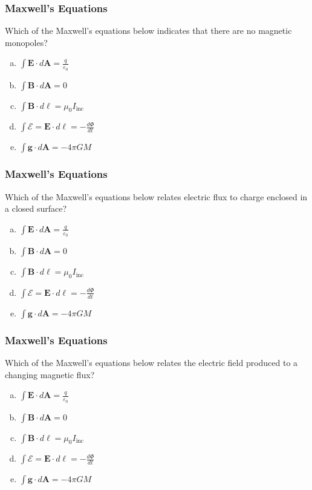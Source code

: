 \documentclass[12pt,aspectratio=169]{beamer}
\newcommand{\mb}[1]{\mathbf{#1}}
\begin{document}
\begin{frame}
  \frametitle{Maxwell's Equations}
  Which of the Maxwell's equations below indicates that there are no
  magnetic monopoles?
  \begin{enumerate}[(a)]
  \item $\displaystyle\int\mb{E}\cdot d\mb{A}=\frac{q}{\varepsilon_0}$
  \item $\displaystyle\int\mb{B}\cdot d\mb{A}=0$
  \item $\displaystyle\int\mb{B}\cdot d\mb{\ell}=\mu_0 I_{\textrm{inc}}$
  \item $\displaystyle\int\mathcal{E}=\mb{E}\cdot d\mb{\ell}=-\frac{d\Phi}{dt}$
  \item $\displaystyle\int\mb{g}\cdot d\mb{A}=-4\pi GM$
  \end{enumerate}
\end{frame}


\begin{frame}
  \frametitle{Maxwell's Equations}
  Which of the Maxwell's equations below relates electric flux to charge
  enclosed in a closed surface?
  \begin{enumerate}[(a)]
  \item $\displaystyle\int\mb{E}\cdot d\mb{A}=\frac{q}{\varepsilon_0}$
  \item $\displaystyle\int\mb{B}\cdot d\mb{A}=0$
  \item $\displaystyle\int\mb{B}\cdot d\mb{\ell}=\mu_0 I_{\textrm{inc}}$
  \item $\displaystyle\int\mathcal{E}=\mb{E}\cdot d\mb{\ell}=-\frac{d\Phi}{dt}$
  \item $\displaystyle\int\mb{g}\cdot d\mb{A}=-4\pi GM$
  \end{enumerate}
\end{frame}

\begin{frame}
  \frametitle{Maxwell's Equations}
  Which of the Maxwell's equations below relates the electric field
  produced to a changing magnetic flux?
  \begin{enumerate}[(a)]
  \item $\displaystyle\int\mb{E}\cdot d\mb{A}=\frac{q}{\varepsilon_0}$
  \item $\displaystyle\int\mb{B}\cdot d\mb{A}=0$
  \item $\displaystyle\int\mb{B}\cdot d\mb{\ell}=\mu_0 I_{\textrm{inc}}$
  \item $\displaystyle\int\mathcal{E}=\mb{E}\cdot d\mb{\ell}=-\frac{d\Phi}{dt}$
  \item $\displaystyle\int\mb{g}\cdot d\mb{A}=-4\pi GM$
  \end{enumerate}
\end{frame}
\end{document}
